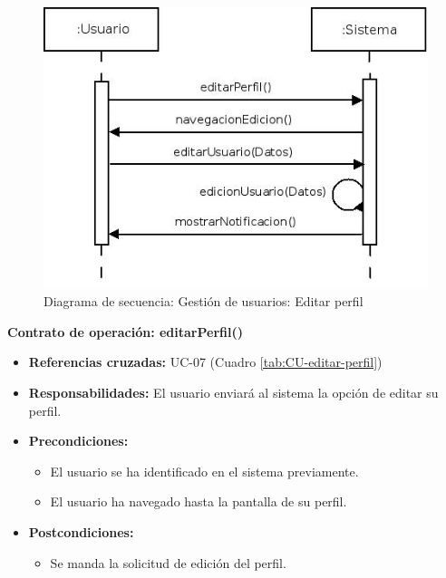 \begin{figure}[h!]
\centering
  \includegraphics[scale=.55]{img/secuencias/gestion-usuarios-editar-perfil.jpeg}
  \caption{Diagrama de secuencia: Gestión de usuarios: Editar perfil}
  \label{fig:secuencia-gestion-usuarios-editar-perfil}
\end{figure}

\textbf{Contrato de operación: editarPerfil()}
\begin{itemize}
\item \textbf{Referencias cruzadas:} UC-07 (Cuadro \ref{tab:CU-editar-perfil})
\item \textbf{Responsabilidades:} El usuario enviará al sistema la opción de editar su perfil.
\item \textbf{Precondiciones:} 
 \begin{itemize}
\item El usuario se ha identificado en el sistema previamente.
\item El usuario ha navegado hasta la pantalla de su perfil.
\end {itemize}
\item \textbf{Postcondiciones:} 
 \begin{itemize}
\item Se manda la solicitud de edición del perfil.
\end {itemize}
\end {itemize}

